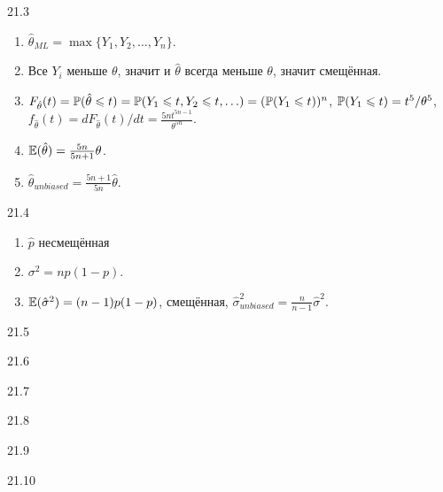 \protect \hypertarget {soln:21.3}{}
\begin{solution}{{21.3}}
\begin{enumerate}
\item $\hat\theta_{ML} = \max\{ Y_1, Y_2, \ldots, Y_n\}$.
\item Все $Y_i$ меньше $\theta$, значит и $\hat\theta$ всегда меньше $\theta$, значит смещённая.
\item $F_{\hat\theta}(t) = \P(\hat\theta \leq t) = \P(Y_1 \leq t, Y_2 \leq t, \ldots) = (\P(Y_1 \leq t))^n$, $\P(Y_1 \leq t) = t^5/\theta^5$, $f_{\hat\theta}(t) = dF_{\hat\theta}(t)/dt = \frac{5n t^{5n-1}}{\theta^{5n}}$.
\item $\E(\hat\theta) = \frac{5n}{5n+1}\theta$.
\item $\hat\theta_{unbiased} = \frac{5n+1}{5n}\hat\theta$.
\end{enumerate}
\end{solution}
\protect \hypertarget {soln:21.4}{}
\begin{solution}{{21.4}}
\begin{enumerate}
  \item $\hat p$ несмещённая
  \item $\sigma^2 = n p(1-p)$.
  \item $\E(\hat\sigma^2) = (n-1)p(1-p)$, смещённая, $\hat\sigma^2_{unbiased} = \frac{n}{n-1} \hat\sigma^2$.
\end{enumerate}
\end{solution}
\protect \hypertarget {soln:21.5}{}
\begin{solution}{{21.5}}

\end{solution}
\protect \hypertarget {soln:21.6}{}
\begin{solution}{{21.6}}

\end{solution}
\protect \hypertarget {soln:21.7}{}
\begin{solution}{{21.7}}

\end{solution}
\protect \hypertarget {soln:21.8}{}
\begin{solution}{{21.8}}

\end{solution}
\protect \hypertarget {soln:21.9}{}
\begin{solution}{{21.9}}

\end{solution}
\protect \hypertarget {soln:21.10}{}
\begin{solution}{{21.10}}

\end{solution}
